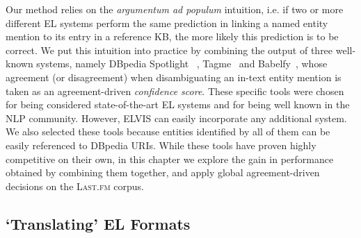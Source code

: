 Our method relies on the \textit{argumentum ad populum} intuition, i.e. if two or more different EL systems perform the same prediction in linking a named entity mention to its entry in a reference KB, the more likely this prediction is to be correct. We put this intuition into practice by combining the output of three well-known systems, namely DBpedia Spotlight~\cite{Mendes2011} , Tagme~\cite{Ferragina2012} and Babelfy~\cite{Moroetal2014b}, whose agreement (or disagreement) when disambiguating an in-text entity mention is taken as an agreement-driven \textit{confidence score}. These specific tools were chosen for being considered state-of-the-art EL systems and for being well known in the NLP community. However, \textsc{ELVIS} can easily incorporate any additional system. We also selected these tools because entities identified by all of them can be easily referenced to DBpedia URIs. 
While these tools have proven highly competitive on their own, in this chapter we explore the gain in performance obtained by combining them together, and apply global agreement-driven decisions on the \textsc{Last.fm} corpus.


\subsection{`Translating' EL Formats}
\label{sec:linking:unification}

